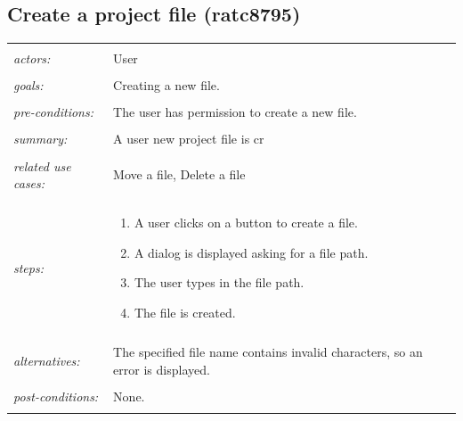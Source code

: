 \documentclass[11pt]{report}
\begin{document}
\begin{IDE-like Features}
\begin{}
\begin{Collaborative features that would be "nice":}
\subsection{Create a project file (ratc8795)}
\begin{tabular}{ p{2cm} p{12cm} }
 \hline
 \\
 \textit{actors:} & User \\ 
 \\
 \textit{goals:} & Creating a new file. \\
 \\
 \textit{pre-conditions:} & The user has permission to create a new file. \\
 \\
 \textit{summary:} & A user new project file is cr \\ 
 \\
 \textit{related use cases:} & Move a file, Delete a file \\ 
 \\
 \textit{steps:} & \begin{enumerate}
  \item A user clicks on a button to create a file.
  \item A dialog is displayed asking for a file path.
  \item The user types in the file path.
  \item The file is created.
 \end{enumerate} \\
 \\
 \textit{alternatives:} & The specified file name contains invalid characters, so an error is displayed. \\
 \\
 \textit{post-conditions:} & None. \\
 \\
\hline
\end{tabular}


\end{Collaborative features that would be "nice":}
\end{}
\end{IDE-like Features}
\end{document}
